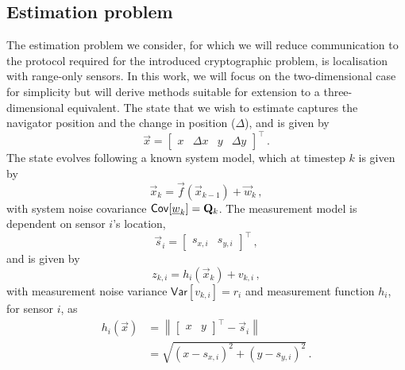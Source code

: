 \documentclass[10pt,letterpaper,oneside,twocolumn,journal]{IEEEtran}
\theoremstyle{definition}
\theoremstyle{definition}
\theoremstyle{remark}
\begin{document}
\subsection{Estimation problem} \label{subsec:est_problem}
The estimation problem we consider, for which we will reduce communication to the protocol required for the introduced cryptographic problem, is localisation with range-only sensors. In this work, we will focus on the two-dimensional case for simplicity but will derive methods suitable for extension to a three-dimensional equivalent. The state that we wish to estimate captures the navigator position and the change in position ($\Delta$), and is given by
\begin{equation}
    \vec{x} = 
    \begin{bmatrix}
        x & \Delta x & y & \Delta y
    \end{bmatrix}^\top\,. \label{eqn:state_definition}
\end{equation}
The state evolves following a known system model, which at timestep $k$ is given by
\begin{equation}
    \vec{x}_k = \vec{f}(\vec{x}_{k-1})+\vec{w}_k\,, \label{eqn:system_model}
\end{equation}
with system noise covariance $\mathsf{Cov}[{\underline{w}}_k]={{\mathbf{Q}}}_k$. The measurement model is dependent on sensor $i$'s location,
\begin{equation}
    \vec{s}_i = 
    \begin{bmatrix}
        s_{x,i} & s_{y,i}
    \end{bmatrix}^\top\,,
\end{equation} 
and is given by
\begin{equation}
    z_{k,i} = h_i(\vec{x}_k)+v_{k,i}\,, \label{eqn:measurement_model}
\end{equation}
with measurement noise variance $\mathsf{Var}[v_{k,i}] = r_i$ and measurement function $h_i$, for sensor $i$, as
\begin{equation}
    \begin{split}
        h_i(\vec{x}) &= \left\lVert
        \begin{bmatrix}
            x & y
        \end{bmatrix}^\top
        - \vec{s}_{i}\right\rVert \\
        &= \sqrt{(x-s_{x,i})^2 + (y-s_{y,i})^2}\,.
    \end{split}
\end{equation}
\end{document}
